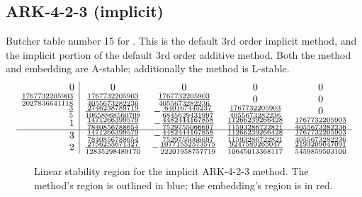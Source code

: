 \documentclass[letterpaper,10pt,english]{sphinxmanual}
\begin{document}
\subsection{ARK-4-2-3 (implicit)}
\label{Butcher:ark-4-2-3-implicit}\label{Butcher:butcher-ark-4-2-3-i}
Butcher table number 15
for {\hyperref[c_interface/User_callable:ARKodeSetIRKTableNum]{}}.  This is
the default 3rd order implicit method, and the implicit portion of the
default 3rd order additive method.  Both the method and embedding are
A-stable; additionally the method is L-stable.
\begin{gather}
\begin{split}\begin{array}{r|cccc}
  0 & 0 & 0 & 0 & 0 \\
  \frac{1767732205903}{2027836641118} & \frac{1767732205903}{4055673282236} & \frac{1767732205903}{4055673282236} & 0 & 0 \\
  \frac{3}{5} & \frac{2746238789719}{10658868560708} & -\frac{640167445237}{6845629431997} & \frac{1767732205903}{4055673282236} & 0 \\
  1 & \frac{1471266399579}{7840856788654} & -\frac{4482444167858}{7529755066697} & \frac{11266239266428}{11593286722821} & \frac{1767732205903}{4055673282236} \\
  \hline
  3 & \frac{1471266399579}{7840856788654} & -\frac{4482444167858}{7529755066697} & \frac{11266239266428}{11593286722821} & \frac{1767732205903}{4055673282236} \\
  2 & \frac{2756255671327}{12835298489170} & -\frac{10771552573575}{22201958757719} & \frac{9247589265047}{10645013368117} & \frac{2193209047091}{5459859503100}
\end{array}\end{split}\notag
\end{gather}\begin{figure}[htbp]
\centering
\capstart

\caption{Linear stability region for the implicit ARK-4-2-3 method.  The method's
region is outlined in blue; the embedding's region is in red.}\end{figure}
\end{document}
